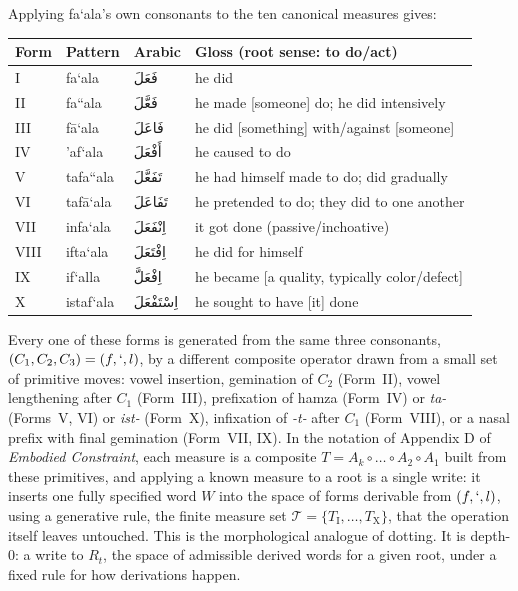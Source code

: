 \documentclass[11pt]{article}
\newcommand{\ar}[1]{\textarabic{#1}}
\begin{document}
Applying fa`ala's own consonants to the ten canonical measures gives:

\begin{center}
\begin{tabular}{llll}
Form & Pattern & Arabic & Gloss (root sense: to do/act) \\ \hline
I & fa`ala & \ar{فَعَلَ} & he did \\
II & fa``ala & \ar{فَعَّلَ} & he made [someone] do; he did intensively \\
III & f\=a`ala & \ar{فَاعَلَ} & he did [something] with/against [someone] \\
IV & 'af`ala & \ar{أَفْعَلَ} & he caused to do \\
V & tafa``ala & \ar{تَفَعَّلَ} & he had himself made to do; did gradually \\
VI & taf\=a`ala & \ar{تَفَاعَلَ} & he pretended to do; they did to one another \\
VII & infa`ala & \ar{اِنْفَعَلَ} & it got done (passive/inchoative) \\
VIII & ifta`ala & \ar{اِفْتَعَلَ} & he did for himself \\
IX & if`alla & \ar{اِفْعَلَّ} & he became [a quality, typically color/defect] \\
X & istaf`ala & \ar{اِسْتَفْعَلَ} & he sought to have [it] done \\
\end{tabular}
\end{center}

Every one of these forms is generated from the same three consonants,
$(C_1,C_2,C_3) = (f,`,l)$, by a different composite operator drawn from a
small set of primitive moves: vowel insertion, gemination of $C_2$
(Form~II), vowel lengthening after $C_1$ (Form~III), prefixation of hamza
(Form~IV) or \emph{ta-} (Forms~V, VI) or \emph{ist-} (Form~X), infixation of
\emph{-t-} after $C_1$ (Form~VIII), or a nasal prefix with final gemination
(Form~VII, IX). In the notation of Appendix D of \emph{Embodied Constraint},
each measure is a composite $T = A_k \circ \dots \circ A_2 \circ A_1$ built
from these primitives, and applying a known measure to a root is a
single write: it inserts one fully specified word $W$ into the space of
forms derivable from $(f,`,l)$, using a generative rule, the finite
measure set $\mathcal{T} = \{T_{\text{I}}, \dots, T_{\text{X}}\}$, that the
operation itself leaves untouched. This is the morphological analogue of
dotting. It is depth-0: a write to $R_t$, the space of admissible derived
words for a given root, under a fixed rule for how derivations happen.
\end{document}
